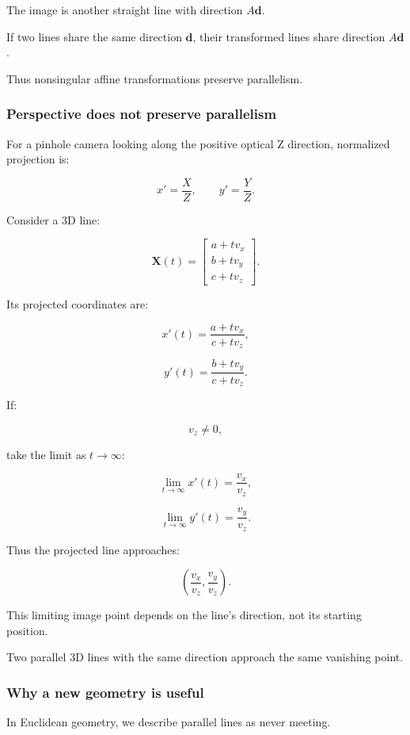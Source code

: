 The image is another straight line with direction \(A\mathbf d\).

If two lines share the same direction \(\mathbf d\), their transformed lines share direction \(A\mathbf d\).

Thus nonsingular affine transformations preserve parallelism.

\subsubsection{Perspective does not preserve parallelism}\label{perspective-does-not-preserve-parallelism}

For a pinhole camera looking along the positive optical Z direction, normalized projection is:

\[
 \boxed{ x'=\frac XZ,\qquad y'=\frac YZ }.
\]

Consider a 3D line:

\[
 \mathbf X(t)= \begin{bmatrix} a+tv_x\\ b+tv_y\\ c+tv_z \end{bmatrix}.
\]

Its projected coordinates are:

\[
 x'(t)=\frac{a+tv_x}{c+tv_z},
\]

\[
 y'(t)=\frac{b+tv_y}{c+tv_z}.
\]

If:

\[
 v_z\ne0,
\]

take the limit as \(t\to\infty\):

\[
 \lim_{t\to\infty}x'(t)=\frac{v_x}{v_z},
\]

\[
 \lim_{t\to\infty}y'(t)=\frac{v_y}{v_z}.
\]

Thus the projected line approaches:

\[
 \boxed{ \left( \frac{v_x}{v_z}, \frac{v_y}{v_z} \right) }.
\]

This limiting image point depends on the line's direction, not its starting position.

Two parallel 3D lines with the same direction approach the same vanishing point.

\subsubsection{Why a new geometry is useful}\label{why-a-new-geometry-is-useful}

In Euclidean geometry, we describe parallel lines as never meeting.

